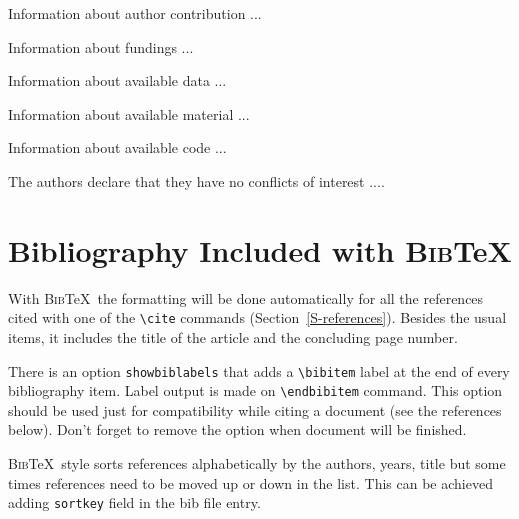 \documentclass[namedreferences]{solarphysics}
\newcommand{\BibTeX}{\textsc{Bib}\TeX}
\begin{document}
\begin{article}
 
\begin{authorcontribution}
Information about author contribution ...
\end{authorcontribution}

\begin{fundinginformation}
Information about fundings ...
\end{fundinginformation}

\begin{dataavailability}
Information about available data ...
\end{dataavailability}

\begin{materialsavailability}
Information about available material ...
\end{materialsavailability}

\begin{codeavailability}
Information about available code ...
\end{codeavailability}

\begin{ethics}
\begin{conflict}
The authors declare that they have no conflicts of interest ....
\end{conflict}
\end{ethics}
  
  
\section*{Bibliography Included with \BibTeX } 
  With \BibTeX\ the formatting will be done automatically for all 
the references cited with one
of the \verb+\cite+ commands (Section~\ref{S-references}).
Besides the usual items, it includes the title of the article 
and the concluding page number. 
   
There is an option \texttt{showbiblabels} that adds a \verb+\bibitem+ 
label at the end of every bibliography item. Label output is made on \verb+\endbibitem+ command.
This option should be used 
just for compatibility while citing a document (see the references below). 
Don't forget to remove the option when document will be finished.

\BibTeX\ style sorts references alphabetically by the authors, years, title but some times references
need to be moved up or down in the list. This can be achieved adding \verb+sortkey+ field in the bib file entry.


\end{article}
\end{document}
